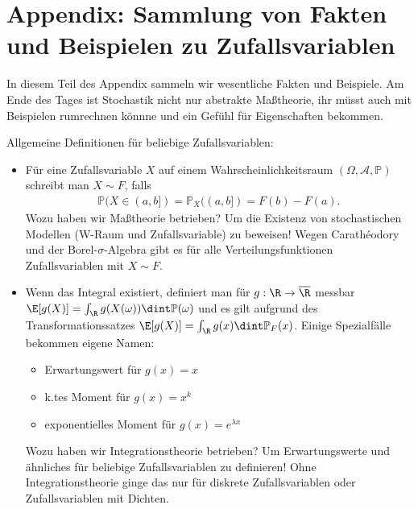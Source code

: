 \chapter{Appendix: Sammlung von Fakten und Beispielen zu Zufallsvariablen}
In diesem Teil des Appendix sammeln wir wesentliche Fakten und Beispiele. Am Ende des Tages ist Stochastik nicht nur abstrakte Ma\ss theorie, ihr m\"usst auch mit Beispielen rumrechnen k\"onnne und ein Gef\"uhl f\"ur Eigenschaften bekommen.\smallskip

Allgemeine Definitionen f\"ur beliebige Zufallsvariablen:
\begin{itemize}
	\item F\"ur eine Zufallsvariable $X$ auf einem Wahrscheinlichkeitsraum $(\Omega, \mathcal A, \mathbb P)$ schreibt man $X\sim F$, falls 
	\begin{align*}
		\mathbb P(X\in (a,b])=\mathbb P_X((a,b])=F(b)-F(a).
	\end{align*}
	Wozu haben wir Ma\ss theorie betrieben? Um die Existenz von stochastischen Modellen (W-Raum und Zufallsvariable) zu beweisen! Wegen Carath\'eodory und der Borel-$\sigma$-Algebra gibt es f\"ur alle Verteilungsfunktionen Zufallsvariablen mit $X\sim F$.
	\item Wenn das Integral existiert, definiert man f\"ur $g:\R\to \overline \R$ messbar $\E[g(X)]=\int_\R g(X(\omega)) \dint \mathbb P(\omega)$ und es gilt aufgrund des Transformationssatzes $\E[g(X)]=\int_\R g(x) \dint \mathbb P_F(x)$. Einige Spezialf\"alle bekommen eigene Namen:
	\begin{itemize}
		\item Erwartungswert f\"ur $g(x)=x$
		\item k.tes Moment f\"ur $g(x)=x^k$
		\item exponentielles Moment f\"ur $g(x)=e^{\lambda x}$ 
	\end{itemize}
	 Wozu haben wir Integrationstheorie betrieben? Um Erwartungswerte und \"ahnliches f\"ur beliebige Zufallsvariablen zu definieren! Ohne Integrationstheorie ginge das nur f\"ur diskrete Zufallsvariablen oder Zufallsvariablen mit Dichten.
	 \end{itemize}


